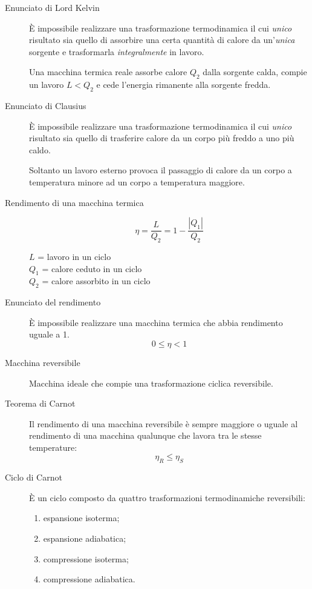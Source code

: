 \documentclass[a4paper,11pt,italian]{article}
\begin{document}
\begin{description}
  \item[Enunciato di Lord Kelvin] 
  È impossibile realizzare una trasformazione termodinamica il cui \emph{unico} risultato sia quello di assorbire una certa quantità di calore da un'\emph{unica} sorgente e trasformarla \emph{integralmente} in lavoro.
  
  Una macchina termica reale assorbe calore $ Q_2 $ dalla sorgente calda, compie un lavoro $ L< Q_2 $ e cede l'energia rimanente alla sorgente fredda.
  
  \item[Enunciato di Clausius] 
  È impossibile realizzare una trasformazione termodinamica il cui \emph{unico} risultato sia quello di trasferire calore da un corpo più freddo a uno più caldo.
   
   Soltanto un lavoro esterno provoca il passaggio di calore da un corpo a temperatura minore ad un corpo a temperatura maggiore.

  \item[Rendimento di una macchina termica]
  \[ \eta = \frac{L}{Q_2} = 1 - \frac{|Q_1|}{Q_2} \]
  \begin{multicols}{2}
  $ L $ = lavoro in un ciclo\\
  $ Q_1 $ = calore ceduto in un ciclo\\
  $ Q_2 $ = calore assorbito in un ciclo
  \end{multicols}
  
  \item[Enunciato del rendimento] 
  È impossibile realizzare una macchina termica che abbia rendimento uguale a 1. \[ 0 \leq \eta < 1 \]
  
  \item[Macchina reversibile] 
  Macchina ideale che compie una trasformazione ciclica reversibile.
  
  \item[Teorema di Carnot] 
  Il rendimento di una macchina reversibile è sempre maggiore o uguale al rendimento di una macchina qualunque che lavora tra le stesse temperature:
  \[ \eta_R \leq \eta_S \]
  
  \item[Ciclo di Carnot] 
  È un ciclo composto da quattro trasformazioni termodinamiche reversibili:
  \begin{multicols}{2}
  \begin{enumerate}
    \item espansione isoterma;
    \item espansione adiabatica;
    \item compressione isoterma;
    \item compressione adiabatica.
  \end{enumerate}
  \end{multicols}


\end{description}
\end{document}
